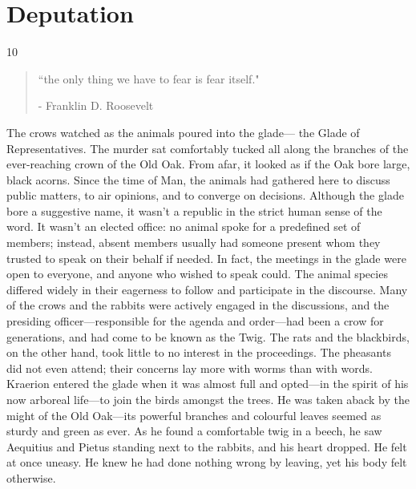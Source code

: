 \chapter{Deputation}

\vspace{-1.3cm}
\begin{localsize}{10}
	\begin{quote}
		``the only thing we have to fear is fear itself."
		\begin{flushright}- Franklin D. Roosevelt \end{flushright}
	\end{quote} 
\end{localsize}
\vspace{1cm}

\setcounter{page}{23}

The crows watched as the animals poured into the glade---
the Glade of Representatives.
The murder sat comfortably tucked all along the branches of the ever-reaching crown of the Old Oak.
From afar, it looked as if the Oak bore large, black acorns.
Since the time of Man, the animals had gathered here to discuss public matters, to air opinions, and to converge on decisions.
Although the glade bore a suggestive name, it wasn't a republic in the strict human sense of the word.
It wasn't an elected office: no animal spoke for a predefined set of members; instead, absent members usually had someone present whom they trusted to speak on their behalf if needed.
In fact, the meetings in the glade were open to everyone, and anyone who wished to speak could.
The animal species differed widely in their eagerness to follow and participate in the discourse.
Many of the crows and the rabbits were actively engaged in the discussions, and the presiding officer---responsible for the agenda and order---had been a crow for generations, and had come to be known as the Twig.
The rats and the blackbirds, on the other hand, took little to no interest in the proceedings.
The pheasants did not even attend; their concerns lay more with worms than with words.\\

Kraerion entered the glade when it was almost full and opted---in the spirit of his now arboreal life---to join the birds amongst the trees.
He was taken aback by the might of the Old Oak---its powerful branches and colourful leaves seemed as sturdy and green as ever.
As he found a comfortable twig in a beech, he saw Aequitius and Pietus standing next to the rabbits, and his heart dropped.
He felt at once uneasy.
He knew he had done nothing wrong by leaving, yet his body felt otherwise.

